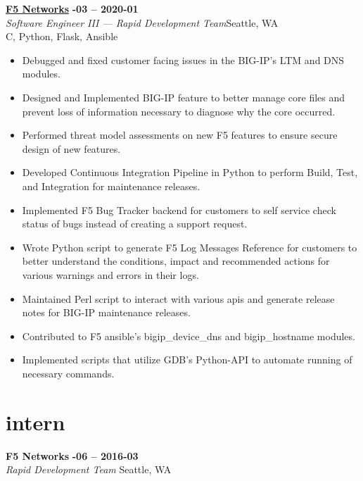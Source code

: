 \documentclass[margin,10pt]{res}
\begin{document}
\begin{resume}
    \href{https://www.f5.com/}{\textbf{F5 Networks}} \hfill \textsc{\bfseries{}-03 -- 2020-01}\\
    \textit{Software Engineer III --- Rapid Development Team}\hfill Seattle, WA\\
    C, Python, Flask, Ansible
    \begin{itemize}
        \item Debugged and fixed customer facing issues in the BIG-IP's LTM and DNS modules.
        \item Designed and Implemented BIG-IP feature to better manage core files and prevent loss of information necessary to
        diagnose why the core occurred.
        \item Performed threat model assessments on new F5 features to ensure secure design of new features.
        \item Developed Continuous Integration Pipeline in Python to perform Build, Test, and Integration for maintenance releases.
        \item Implemented F5 Bug Tracker backend for customers to self service check status of bugs instead of creating a support
        request.
        \item Wrote Python script to generate F5 Log Messages Reference for customers to better understand the conditions, impact
        and recommended actions for various warnings and errors in their logs.
        \item Maintained Perl script to interact with various apis and generate release notes for BIG-IP maintenance releases.
        \item Contributed to F5 ansible's bigip\_device\_dns and bigip\_hostname modules.
        \item Implemented scripts that utilize GDB's Python-API to automate running of necessary commands.
    \end{itemize}
\section{\sc \lsstyle intern}
    \textbf{F5 Networks} \hfill \textsc{\bfseries{}-06 -- 2016-03}\\
    \textit{Rapid Development Team} \hfill Seattle, WA\\


\end{resume}
\end{document}
